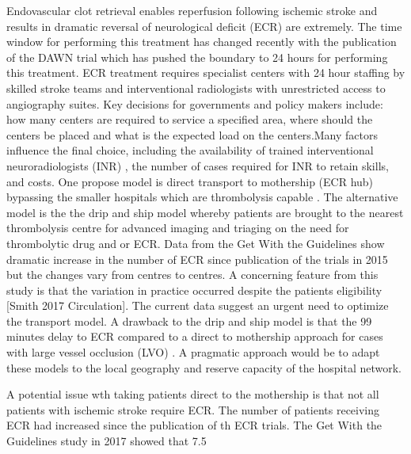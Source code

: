 \documentclass[utf8]{frontiersHLTH}
\begin{document}
Endovascular clot retrieval enables reperfusion following ischemic stroke and results in dramatic reversal of neurological deficit 
(ECR)\cite{berkhemer2015randomized,goyal2016endovascular,goyal2015randomized,campbell2015endovascular,saver2015stent}
are extremely. The time window for performing this treatment has changed recently with the publication of the DAWN trial which has pushed the boundary to 24 hours for performing this treatment\cite{nogueira2018thrombectomy}. ECR treatment requires
specialist centers with 24 hour staffing by skilled stroke teams and interventional radiologists with unrestricted access to angiography
suites. Key decisions for governments and policy makers include: how many centers are required to service a specified area, where should
the centers be placed and what is the expected load on the centers\cite{Phan_2017}.Many factors influence the final choice, including the availability of trained interventional neuroradiologists (INR) , the number of cases required for INR to
retain skills, and costs. One propose model is direct transport to mothership (ECR hub) bypassing the smaller hospitals which are thrombolysis capable \cite{Milne_2017}. The alternative model is the the drip and ship model whereby patients are brought to the nearest thrombolysis centre for advanced imaging and triaging on the need for thrombolytic drug and or ECR. Data from the Get With the Guidelines show dramatic increase in the number of ECR since publication of the trials in 2015 but the changes vary from centres to centres. A concerning feature from this study is that the variation in practice occurred despite the patients eligibility [Smith 2017 Circulation]. 
The current data suggest an urgent need to optimize the transport model. A drawback to the drip and ship model is that the 99 minutes delay to ECR compared to a direct to mothership approach for cases with large vessel occlusion
(LVO) \cite{froehler2017interhospital}. A pragmatic approach would be to adapt these models to the local geography and reserve capacity of the hospital network.

A potential issue wth taking patients direct to the mothership is that not all patients with ischemic stroke require ECR. The number of patients receiving ECR had increased since the publication of th ECR trials. The Get With the Guidelines study in 2017 showed that 7.5%
\end{document}
